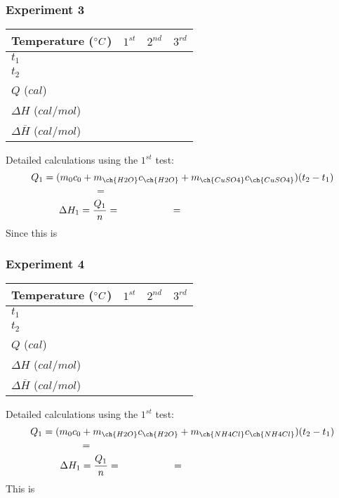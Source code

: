 \subsubsection{Experiment 3}

\begin{table}[ht]
	\centering
	{\renewcommand{\arraystretch}{1.75}
		\begin{tabular}{|p{3cm}|p{3cm}|p{3cm}|p{3cm}|}
			\hline
			Temperature ($\degree C$) & $1^{st}$ & $2^{nd}$ & $3^{rd}$ \\ \hline
			$t_1$ & & & \\ \hline
			$t_2$ & & & \\ \hline
			$Q$ ($cal$) & & & \\ \hline
			$\Delta H$ ($cal/mol$) & & & \\ \hline
			$\Delta \overline{H}$ ($cal/mol$) & \multicolumn{3}{l|}{} \\ \hline
	\end{tabular}}
\end{table}
Detailed calculations using the $1^{st}$ test:
\[Q_1 = (m_0c_0 + m_{\ch{H2O}}c_{\ch{H2O}}+m_{\ch{CuSO4}}c_{\ch{CuSO4}})(t_2-t_1)\]
\[= \hspace{7cm}\]\vspace{0.1cm}
\[\Delta H_1 = \frac{Q_1}{n} = \hspace{2cm} = \hspace{4.5cm}\]
Since this is 

\subsubsection{Experiment 4}
\begin{table}[ht]
	\centering
	{\renewcommand{\arraystretch}{1.75}
		\begin{tabular}{|p{3cm}|p{3cm}|p{3cm}|p{3cm}|}
			\hline
			Temperature ($\degree C$) & $1^{st}$ & $2^{nd}$ & $3^{rd}$ \\ \hline
			$t_1$ & & & \\ \hline
			$t_2$ & & & \\ \hline
			$Q$ ($cal$) & & & \\ \hline
			$\Delta H$ ($cal/mol$) & & & \\ \hline
			$\Delta \overline{H}$ ($cal/mol$) & \multicolumn{3}{l|}{} \\ \hline
	\end{tabular}}
\end{table}
Detailed calculations using the $1^{st}$ test:
\[Q_1 = (m_0c_0 + m_{\ch{H2O}}c_{\ch{H2O}}+m_{\ch{NH4Cl}}c_{\ch{NH4Cl}})(t_2-t_1)\]
\[= \hspace{6.9cm}\]\vspace{0.1cm}
\[\Delta H_1 = \frac{Q_1}{n} = \hspace{2cm} = \hspace{4.4cm}\]
This is 

